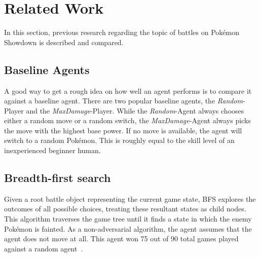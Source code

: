 
\chapter{Related Work}
\label{ch:relatedwork}
In this section, previous research regarding the topic of battles on Pokémon Showdown is described and compared.

\section{Baseline Agents}
\label{sec:eval-challenges-baseline}
A good way to get a rough idea on how well an agent performs is to compare it against a baseline agent.
There are two popular baseline agents, the \textit{Random}-Player and the \textit{MaxDamage}-Player.
While the \textit{Random}-Agent always chooses either a random move or a random switch, the \textit{MaxDamage}-Agent
always picks the move with the highest base power. If no move is available, the agent will switch to a random 
Pokémon. This is roughly equal to the skill level of an inexperienced beginner human.  

\section{Breadth-first search}
\label{sec:related-bfs}
Given a root battle object representing the current game state, \ac{BFS} explores the outcomes of all possible choices,
treating these resultant states as child nodes. This algorithm traverses the game tree until it finds a state in which
the enemy Pokémon is fainted. As a non-adversarial algorithm, the agent assumes that the agent does not move at all.
This agent won 75 out of 90 total games played against a random agent~\autocite{Lee_Togelius_2017}.

